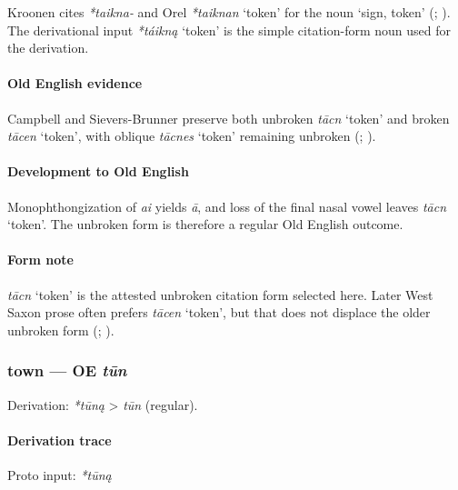 \documentclass[
  british,
  a4paper,
]{article}
\providecommand{\Recon}[1]{\emph{*#1}}
\begin{document}
Kroonen cites \emph{*taikna-} and Orel \Recon{taiknan} `token' for the
noun `sign, token' (;
). The derivational input
\Recon{táikną} `token' is the simple citation-form noun used for the
derivation.

\paragraph{Old English evidence}\label{old-english-evidence-62}

Campbell and Sievers-Brunner preserve both unbroken \emph{tācn} `token'
and broken \emph{tācen} `token', with oblique \emph{tācnes} `token'
remaining unbroken (;
).

\paragraph{Development to Old
English}\label{development-to-old-english-62}

Monophthongization of \emph{ai} yields \emph{ā}, and loss of the final
nasal vowel leaves \emph{tācn} `token'. The unbroken form is therefore a
regular Old English outcome.

\paragraph{Form note}\label{form-note-23}

\emph{tācn} `token' is the attested unbroken citation form selected
here. Later West Saxon prose often prefers \emph{tācen} `token', but
that does not displace the older unbroken form
(;
).

\subsubsection{\texorpdfstring{town --- OE
\emph{tūn}}{town --- OE tūn}}\label{town-oe-tux16bn}

Derivation: \emph{*tūną} \textgreater{} \emph{tūn} (regular).

\paragraph{Derivation trace}\label{derivation-trace-67}

Proto input: \emph{*tūną}
\end{document}
